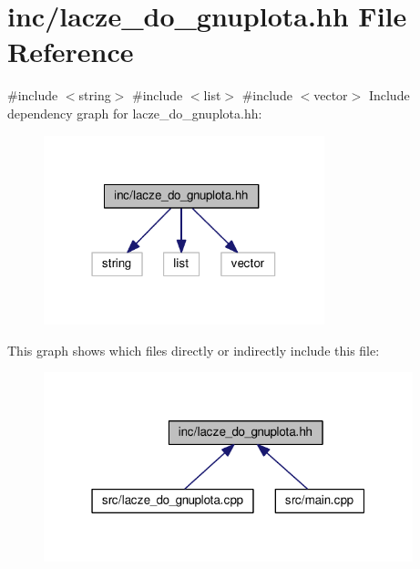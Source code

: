 \hypertarget{lacze__do__gnuplota_8hh}{}\section{inc/lacze\+\_\+do\+\_\+gnuplota.hh File Reference}
\label{lacze__do__gnuplota_8hh}
{\ttfamily \#include $<$string$>$}\newline
{\ttfamily \#include $<$list$>$}\newline
{\ttfamily \#include $<$vector$>$}\newline
Include dependency graph for lacze\+\_\+do\+\_\+gnuplota.\+hh\+:\nopagebreak
\begin{figure}[H]
\begin{center}
\leavevmode
\includegraphics[width=231pt]{lacze__do__gnuplota_8hh__incl}
\end{center}
\end{figure}
This graph shows which files directly or indirectly include this file\+:\nopagebreak
\begin{figure}[H]
\begin{center}
\leavevmode
\includegraphics[width=304pt]{lacze__do__gnuplota_8hh__dep__incl}
\end{center}
\end{figure}

